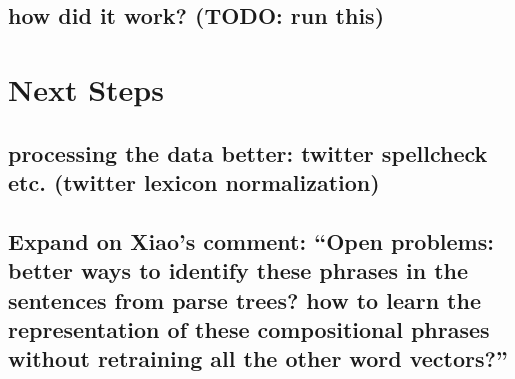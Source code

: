 \documentclass[11pt]{article} %
\begin{document}
\subsection{how did it work? (TODO: run this)}

\section{Next Steps}

\subsection{processing the data better: twitter spellcheck etc. (twitter lexicon normalization)}
\subsection{Expand on Xiao's comment: “Open problems: better ways to identify these phrases in the sentences from parse trees? how to learn the representation of these compositional phrases without retraining all the other word vectors?”}
\end{document}
